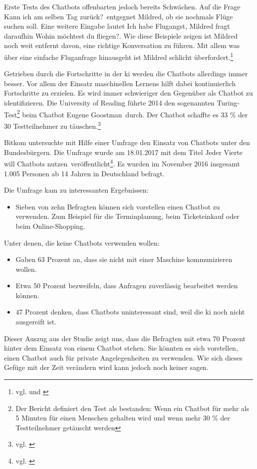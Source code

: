 Erste Tests des Chatbots offenbarten jedoch bereits Schwächen. Auf die Frage \glqq Kann ich am selben Tag zurück?\grqq\ entgegnet Mildred, ob sie nochmals Flüge suchen soll. Eine weitere Eingabe lautet \glqq Ich habe Flugangst\grqq, Mildred fragt daraufhin \glqq Wohin möchtest du fliegen?\grqq. Wie diese Beispiele zeigen ist Mildred noch weit entfernt davon, eine richtige Konversation zu führen. Mit allem was über eine einfache Fluganfrage hinausgeht ist Mildred schlicht überfordert.\footnote{vgl. \cite{LHQuelle1} und \cite{LHQuelle2}} 

Getrieben durch die Fortschritte in der \ac{ki} werden die Chatbots allerdings immer besser. Vor allem der Einsatz maschinellen Lernens hilft dabei kontinuierlich Fortschritte zu erzielen. Es wird immer schwieriger den Gegenüber als Chatbot zu identifizieren. Die University of Reading führte 2014 den sogenannten Turing-Test\footnote{Der Bericht definiert den Test als bestanden: Wenn ein Chatbot für mehr als 5 Minuten für einen Menschen gehalten wird und wenn mehr 30 \% der Testteilnehmer getäuscht werden} beim Chatbot \glqq Eugene Goostman\grqq\ durch. Der Chatbot schaffte es 33 \% der 30 Testteilnehmer zu täuschen.\footnote{vgl. \cite{UnivOfReading}}

Bitkom untersuchte mit Hilfe einer Umfrage den Einsatz von Chatbots unter den Bundesbürgern. Die Umfrage wurde am 18.01.2017 mit dem Titel \glqq Jeder Vierte will Chatbots nutzen\grqq\ veröffentlicht\footnote{vgl. \cite{BitkomChatbot}}. Es wurden im November 2016 insgesamt 1.005 Personen ab 14 Jahren in Deutschland befragt. 

Die Umfrage kam zu interessanten Ergebnissen:
\begin{itemize}
	\item Sieben von zehn Befragten können sich vorstellen einen Chatbot zu verwenden. Zum Beispiel für die Terminplanung, 	beim Ticketeinkauf oder beim Online-Shopping.
\end{itemize}
Unter denen, die keine Chatbots verwenden wollen:
\begin{itemize}	
	\item Gaben 63 Prozent an, dass sie nicht mit einer Maschine kommunizieren wollen. 
	\item Etwa 50 Prozent bezweifeln, dass Anfragen zuverlässig bearbeitet werden können.
	\item 47 Prozent denken, dass Chatbots uninteressant sind, weil die \ac{ki} noch nicht ausgereift ist.
\end{itemize}
Dieser Auszug aus der Studie zeigt uns, dass die Befragten mit etwa 70 Prozent hinter dem Einsatz von einem Chatbot stehen. Sie könnten es sich vorstellen, einen Chatbot auch für private Angelegenheiten zu verwenden. Wie sich dieses Gefüge mit der Zeit verändern wird kann jedoch noch keiner sagen.  

